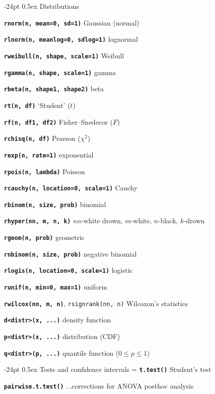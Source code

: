 \documentclass[8pt,landscape]{article}
\makeatletter
\renewcommand\section{\@startsection{section}{1}{0mm}%
                                     {-24pt}%
                                     {0.5ex}%
                                {\color{blue}\normalfont\large\bfseries}}
\newcommand{\code}{\texttt}
\newcommand{\bcode}[1]{\texttt{\textbf{#1}}}
\makeatother
\begin{document}
\begin{multicols*}{3}


\section{Distributions}

\bcode{rnorm(n, mean=0, sd=1)} Gaussian (normal)  

\bcode{rlnorm(n, meanlog=0, sdlog=1)} lognormal  

\bcode{rweibull(n, shape, scale=1)} Weibull

\bcode{rgamma(n, shape, scale=1)} gamma  

\bcode{rbeta(n, shape1, shape2)} beta

\bcode{rt(n, df)} `Student' ($t$)  

\bcode{rf(n, df1, df2)} Fisher--Snedecor ($F$)

\bcode{rchisq(n, df)} Pearson   ($\chi^2$)  

\bcode{rexp(n, rate=1)} exponential

\bcode{rpois(n, lambda)} Poisson

\bcode{rcauchy(n, location=0, scale=1)} Cauchy  

\bcode{rbinom(n, size, prob)} binomial  

\bcode{rhyper(nn, m, n, k)} $nn$-white drown, $m$-white, $n$-black, $k$-drown

\bcode{rgeom(n, prob)} geometric  

\bcode{rnbinom(n, size, prob)} negative binomial  

\bcode{rlogis(n, location=0, scale=1)} logistic  

\bcode{runif(n, min=0, max=1)} uniform  

\bcode{rwilcox(nn, m, n)}, \code{rsignrank(nn, n)} Wilcoxon's statistics  

\bcode{d<distr>(x, ...)} density function

\bcode{p<distr>(x, ...)} distribution (CDF)

\bcode{q<distr>(p, ...)} quantile function ($0 \le p \le 1$)




\section{Tests and confidence intervals}
\everypar={\hangindent=9mm}
\bcode{t.test()} Student's test

\bcode{pairwise.t.test()} ...corrections for ANOVA posthoc analysis


\end{multicols*}
\end{document}
